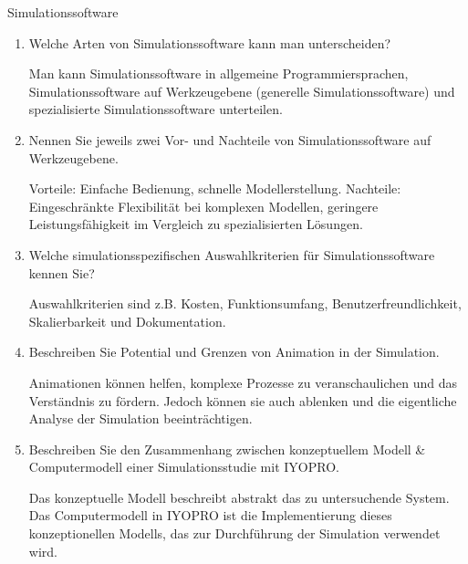 \documentclass{article}
\begin{document}
\begin{exercise}{Simulationssoftware}
  \begin{enumerate}
    \item Welche Arten von Simulationssoftware kann man unterscheiden?
          \begin{solution}
            Man kann Simulationssoftware in allgemeine Programmiersprachen, Simulationssoftware auf Werkzeugebene (generelle Simulationssoftware) und spezialisierte Simulationssoftware unterteilen.
          \end{solution}

    \item Nennen Sie jeweils zwei Vor- und Nachteile von Simulationssoftware auf Werkzeugebene.
          \begin{solution}
            Vorteile: Einfache Bedienung, schnelle Modellerstellung. Nachteile: Eingeschränkte Flexibilität bei komplexen Modellen, geringere Leistungsfähigkeit im Vergleich zu spezialisierten Lösungen.
          \end{solution}

    \item Welche simulationsspezifischen Auswahlkriterien für Simulationssoftware kennen Sie?
          \begin{solution}
            Auswahlkriterien sind z.B. Kosten, Funktionsumfang, Benutzerfreundlichkeit, Skalierbarkeit und Dokumentation.
          \end{solution}

    \item Beschreiben Sie Potential und Grenzen von Animation in der Simulation.
          \begin{solution}
            Animationen können helfen, komplexe Prozesse zu veranschaulichen und das Verständnis zu fördern. Jedoch können sie auch ablenken und die eigentliche Analyse der Simulation beeinträchtigen.
          \end{solution}

    \item Beschreiben Sie den Zusammenhang zwischen konzeptuellem Modell \& Computermodell einer Simulationsstudie mit IYOPRO.
          \begin{solution}
            Das konzeptuelle Modell beschreibt abstrakt das zu untersuchende System. Das Computermodell in IYOPRO ist die Implementierung dieses konzeptionellen Modells, das zur Durchführung der Simulation verwendet wird.
          \end{solution}


\end{enumerate}
\end{exercise}
\end{document}
